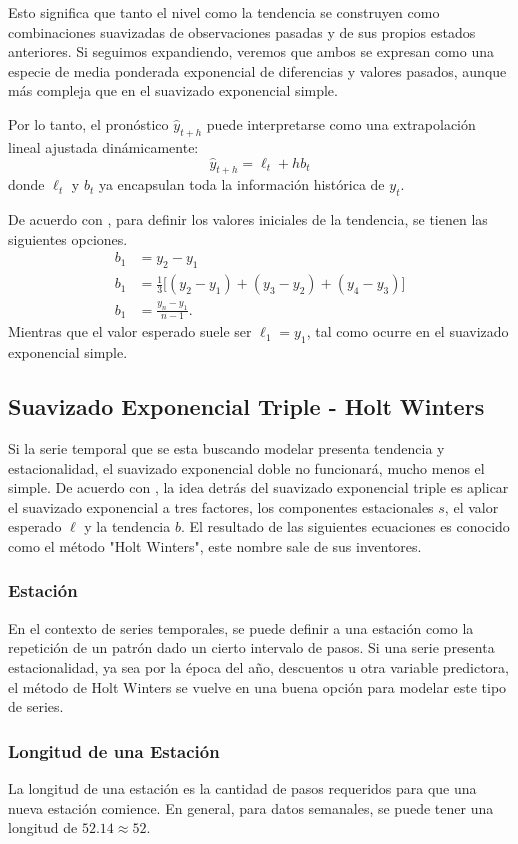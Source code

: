 \documentclass[12pt,letterpaper]{article}
\begin{document}
Esto significa que tanto el nivel como la tendencia se construyen como combinaciones suavizadas de observaciones pasadas y de sus propios estados anteriores. Si seguimos expandiendo, veremos que ambos se expresan como una especie de media ponderada exponencial de diferencias y valores pasados, aunque más compleja que en el suavizado exponencial simple.

Por lo tanto, el pronóstico \( \hat{y}_{t+h} \) puede interpretarse como una extrapolación lineal ajustada dinámicamente:
\[
\hat{y}_{t+h} = \ell_t + h b_t
\]
donde \( \ell_t \) y \( b_t \) ya encapsulan toda la información histórica de \( y_t \).

De acuerdo con \cite{nist-des}, para definir los valores iniciales de la tendencia, se tienen las siguientes opciones.
\begin{align}
    b_1 &= y_2 - y_1\\
    b_1 &= \frac{1}{3} \big[ (y_2-y_1) + (y_3 - y_2) + (y_4-y_3)\big]\\
    b_1 &= \frac{y_n - y_1}{n-1}.
\end{align}
Mientras que el valor esperado suele ser $\ell_1=y_1$, tal como ocurre en el suavizado exponencial simple. 


\subsection{Suavizado Exponencial Triple - Holt Winters}
Si la serie temporal que se esta buscando modelar presenta tendencia y estacionalidad, el suavizado exponencial doble no funcionará, mucho menos el simple. De acuerdo con \cite{grisha-triple-exp}, la idea detrás del suavizado exponencial triple es aplicar el suavizado exponencial a tres factores, los componentes estacionales $s$, el valor esperado $\ell$ y la tendencia $b$. El resultado de las siguientes ecuaciones es conocido como el método "Holt Winters", este nombre sale de sus inventores. 

\subsubsection{Estación}
En el contexto de series temporales, se puede definir a una estación como la repetición de un patrón dado un cierto intervalo de pasos. Si una serie presenta estacionalidad, ya sea por la época del año, descuentos u otra variable predictora, el método de Holt Winters se vuelve en una buena opción para modelar este tipo de series. 

\subsubsection{Longitud de una Estación}
La longitud de una estación es la cantidad de pasos requeridos para que una nueva estación comience. En general, para datos semanales, se puede tener una longitud de $52.14\approx52$. 
\end{document}
